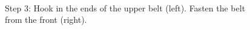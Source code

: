 \begin{figure}[!ht]
\centering
\mbox{\quad
{}}
\caption{Step 3: Hook in the ends of the upper belt (left). Fasten the belt from the front (right).} %
\end{figure}

